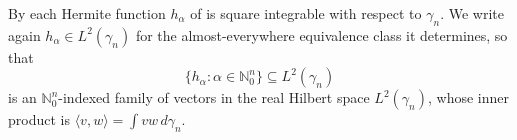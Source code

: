 \begin{definition}
By  each Hermite function $h_\alpha$ of
 is square integrable with respect to $\gamma_n$.  We write
again $h_\alpha \in L^2(\gamma_n)$ for the almost-everywhere equivalence class it
determines, so that
\[
  \{h_\alpha : \alpha \in \mathbb{N}_0^n\} \subseteq L^2(\gamma_n)
\]
is an $\mathbb{N}_0^n$-indexed family of vectors in the real Hilbert space
$L^2(\gamma_n)$, whose inner product is
$\langle v, w\rangle = \int v w \, d\gamma_n$.
\end{definition}
